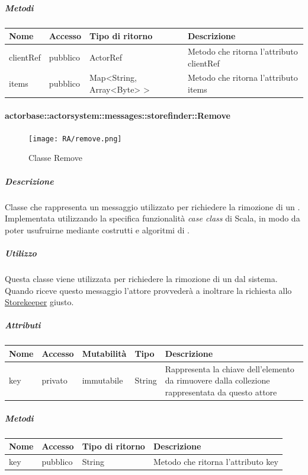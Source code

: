 \documentclass{scalatekids-article}
\begin{document}
\subparagraph{Metodi}
\begin{tabular}{| p{3cm} | p{1.5cm} | p{3.5cm} | p{9cm} |}
  \hline
  Nome & Accesso & Tipo di ritorno & Descrizione\\
  \hline
  clientRef & pubblico & ActorRef & Metodo che ritorna l'attributo clientRef\\
  \hline
  items & pubblico & Map<String, Array<Byte> > & Metodo che ritorna l'attributo items\\
  \hline
\end{tabular}

\paragraph{actorbase::actorsystem::messages::storefinder::Remove}
\label{sec:actorbase::actorsystem::messages::storefinder::Remove}

\begin{figure}[H]
  \begin{center}
    \texttt{[image: RA/remove.png]}
    \caption{Classe Remove}
  \end{center}
\end{figure}

\subparagraph{Descrizione}
Classe che rappresenta un messaggio utilizzato per richiedere la rimozione di un
.\\Implementata utilizzando la specifica funzionalità \textit{case
class} di Scala, in modo da poter usufruirne mediante costrutti e algoritmi di
.

\subparagraph{Utilizzo}
Questa classe viene utilizzata per richiedere la rimozione di un  dal
sistema.\\Quando riceve questo messaggio l'attore provvederà a inoltrare la
richiesta allo \hyperref[sec:actorbase::actorsystem::actors::storekeeper::Storekeeper]{Storekeeper}
giusto.

\subparagraph{Attributi}
\begin{tabular}{| p{2cm} | p{1.5cm} | p{2cm} | p{3cm} | p{8.5cm} |}
  \hline
  Nome & Accesso & Mutabilità & Tipo & Descrizione\\
  \hline
  key & privato & immutabile & String & Rappresenta la chiave dell'elemento da rimuovere dalla collezione rappresentata da questo attore\\
  \hline
\end{tabular}

\subparagraph{Metodi}
\begin{tabular}{| p{3cm} | p{1.5cm} | p{3.5cm} | p{9cm} |}
  \hline
  Nome & Accesso & Tipo di ritorno & Descrizione\\
  \hline
  key & pubblico & String & Metodo che ritorna l'attributo key\\
  \hline
\end{tabular}
\end{document}
